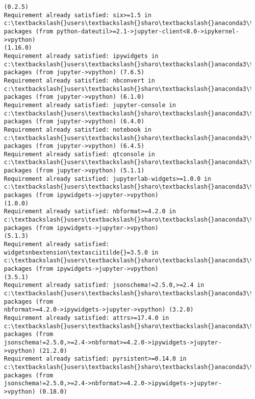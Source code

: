 \documentclass[11pt]{article}
\begin{document}
\begin{Verbatim}[commandchars=\\\{\}]
(0.2.5)
Requirement already satisfied: six>=1.5 in c:\textbackslash{}users\textbackslash{}sharo\textbackslash{}anaconda3\textbackslash{}lib\textbackslash{}site-
packages (from python-dateutil>=2.1->jupyter-client<8.0->ipykernel->vpython)
(1.16.0)
Requirement already satisfied: ipywidgets in c:\textbackslash{}users\textbackslash{}sharo\textbackslash{}anaconda3\textbackslash{}lib\textbackslash{}site-
packages (from jupyter->vpython) (7.6.5)
Requirement already satisfied: nbconvert in c:\textbackslash{}users\textbackslash{}sharo\textbackslash{}anaconda3\textbackslash{}lib\textbackslash{}site-
packages (from jupyter->vpython) (6.1.0)
Requirement already satisfied: jupyter-console in
c:\textbackslash{}users\textbackslash{}sharo\textbackslash{}anaconda3\textbackslash{}lib\textbackslash{}site-packages (from jupyter->vpython) (6.4.0)
Requirement already satisfied: notebook in c:\textbackslash{}users\textbackslash{}sharo\textbackslash{}anaconda3\textbackslash{}lib\textbackslash{}site-
packages (from jupyter->vpython) (6.4.5)
Requirement already satisfied: qtconsole in c:\textbackslash{}users\textbackslash{}sharo\textbackslash{}anaconda3\textbackslash{}lib\textbackslash{}site-
packages (from jupyter->vpython) (5.1.1)
Requirement already satisfied: jupyterlab-widgets>=1.0.0 in
c:\textbackslash{}users\textbackslash{}sharo\textbackslash{}anaconda3\textbackslash{}lib\textbackslash{}site-packages (from ipywidgets->jupyter->vpython)
(1.0.0)
Requirement already satisfied: nbformat>=4.2.0 in
c:\textbackslash{}users\textbackslash{}sharo\textbackslash{}anaconda3\textbackslash{}lib\textbackslash{}site-packages (from ipywidgets->jupyter->vpython)
(5.1.3)
Requirement already satisfied: widgetsnbextension\textasciitilde{}=3.5.0 in
c:\textbackslash{}users\textbackslash{}sharo\textbackslash{}anaconda3\textbackslash{}lib\textbackslash{}site-packages (from ipywidgets->jupyter->vpython)
(3.5.1)
Requirement already satisfied: jsonschema!=2.5.0,>=2.4 in
c:\textbackslash{}users\textbackslash{}sharo\textbackslash{}anaconda3\textbackslash{}lib\textbackslash{}site-packages (from
nbformat>=4.2.0->ipywidgets->jupyter->vpython) (3.2.0)
Requirement already satisfied: attrs>=17.4.0 in
c:\textbackslash{}users\textbackslash{}sharo\textbackslash{}anaconda3\textbackslash{}lib\textbackslash{}site-packages (from
jsonschema!=2.5.0,>=2.4->nbformat>=4.2.0->ipywidgets->jupyter->vpython) (21.2.0)
Requirement already satisfied: pyrsistent>=0.14.0 in
c:\textbackslash{}users\textbackslash{}sharo\textbackslash{}anaconda3\textbackslash{}lib\textbackslash{}site-packages (from
jsonschema!=2.5.0,>=2.4->nbformat>=4.2.0->ipywidgets->jupyter->vpython) (0.18.0)

\end{Verbatim}
\end{document}
